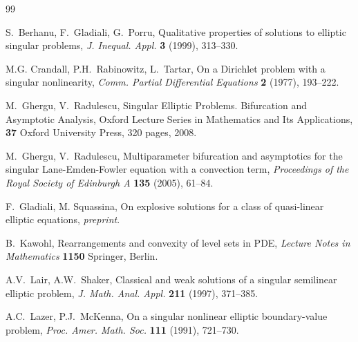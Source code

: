 \documentclass[10pt]{amsart}
\numberwithin{equation}{section}
\theoremstyle{definition}
\begin{document}
\bigskip


\begin{thebibliography}{99}

{\sc S.\ Berhanu, F.\ Gladiali, G.\ Porru}, 
Qualitative properties of solutions to elliptic singular problems,
{\em J. Inequal. Appl.} {\bf 3} (1999), 313--330.

{\sc M.G. Crandall, P.H.\  Rabinowitz, L.\ Tartar}, 
On a Dirichlet problem with a singular nonlinearity, 
{\em Comm. Partial Differential Equations} {\bf 2} (1977), 193--222.

{\sc M.\ Ghergu, V.\ Radulescu}, 
Singular Elliptic Problems. Bifurcation and Asymptotic Analysis, 
Oxford Lecture Series in Mathematics and Its Applications, {\bf 37} 
Oxford University Press, 320 pages, 2008.

{\sc M.\ Ghergu, V.\ Radulescu}, Multiparameter bifurcation and asymptotics for the
singular Lane-Emden-Fowler equation with a convection term, 
{\em Proceedings of the Royal Society of Edinburgh A} {\bf 135} (2005), 61--84.

{\sc F.\ Gladiali, M. Squassina}, 
On explosive solutions for a class of quasi-linear elliptic equations, {\em preprint}.





{\sc B.\ Kawohl},
Rearrangements and convexity of level sets in PDE,
{\em Lecture Notes in Mathematics} {\bf 1150} Springer, Berlin.


{\sc A.V.\ Lair, A.W.\ Shaker}, 
Classical and weak solutions of a singular semilinear elliptic problem, 
{\em J. Math. Anal. Appl.} {\bf 211} (1997), 371--385.

{\sc A.C.\ Lazer, P.J.\ McKenna}, 
On a singular nonlinear elliptic boundary-value problem, 
{\em Proc. Amer. Math. Soc.} {\bf 111} (1991), 721--730.


\end{thebibliography}
\end{document}
